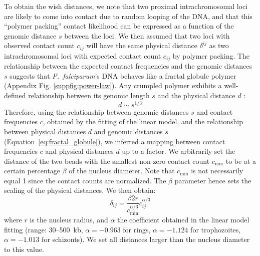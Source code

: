 To obtain the wish distances, we note that two proximal intrachromosomal loci
are likely to come into contact due to random looping of the DNA, and that
this ``polymer packing'' contact likelihood can be expressed as a function of
the genomic distance $s$ between the loci. We then assumed that two loci with
observed contact count $c_{ij}$ will have the same physical distance
$\delta^{ij}$ as two intrachromosomal loci with expected contact count
$c_{ij}$ by polymer packing. The relationship between the expected contact
frequencies and the genomic distances $s$ suggests that \textit{P.\
falciparum}'s DNA behaves like a fractal globule polymer
\citep{lieberman-aiden:comprehensive} (Appendix Fig.
\ref{suppfig:power-law}). Any crumpled polymer exhibits a well-defined
relationship between its genomic length $s$ and the physical distance $d$
\citep{grosberg:role}:
\begin{equation}
d \sim s^{1 / 3}
\label{eq:fractal_globule}
\end{equation}
Therefore, using the relationship between genomic distances $s$ and
contact frequencies $c$, obtained by the fitting of the linear
model, and the relationship between physical distances $d$ and genomic
distances $s$ (Equation~\ref{eq:fractal_globule}), we inferred a
mapping between contact frequencies $c$ and physical distances $d$
up to a factor. We arbitrarily set the distance of the two beads with
the smallest non-zero contact count $c_\text{min}$ to be at a
certain percentage $\beta$ of the nucleus diameter. Note that
$c_\text{min}$ is not necessarily equal 1 since the contact counts are
normalized. The $\beta$ parameter hence sets the scaling of the physical
distances. We then obtain:
\begin{equation}
\delta_{ij} = \frac{\beta 2 r}{c_\text{min}^{\alpha / 3}} c_{ij}^{\alpha / 3}
\end{equation}
where $r$ is the nucleus radius, and $\alpha$ the coefficient obtained
in the linear model fitting (range: 30--500~kb, $\alpha=-0.963$ for rings,
$\alpha = -1.124$ for trophozoites, $\alpha = -1.013$ for schizonts).
We set all distances larger than the nucleus diameter to this value.

